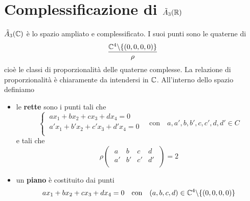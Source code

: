 \section{Complessificazione di \(\tilde{A}_{3}(\RR )\)}
\(\tilde{A}_{3}(\CC) \) è lo spazio ampliato e complessificato. I suoi punti sono le quaterne di \[
\frac{\CC ^{4} \backslash  \{(0,0,0,0)\}}{\rho }
\] cioè le classi di proporzionalità delle quaterne complesse. La relazione di proporzionalità è chiaramente da intendersi in \(\CC\). All'interno dello spazio definiamo
 \begin{itemize}
    \item le \textbf{rette} sono i punti tali che \[
\begin{cases}
    \ ax_1+ bx_2 + cx_3+dx_4 =0 \\
    \ a'x_1 + b'x_2 + c'x_3 + d'x_4 = 0 \\
\end{cases} \quad \text{con}\quad a,a',b,b',c,c',d,d' \in C
    \] e tali che \[
    \rho
\left( \; \begin{matrix}
    a & b & c & d \\
    a' & b' & c' & d' \\
\end{matrix} \; \right) = 2
    \]
    \item un \textbf{piano} è costituito dai punti \[
    ax_1 + bx_2+cx_3+dx_4 = 0 \quad \text{con}\quad (a,b,c,d) \in \CC^{4} \backslash \{(0,0,0,0)\} 
    \] 
\end{itemize}


